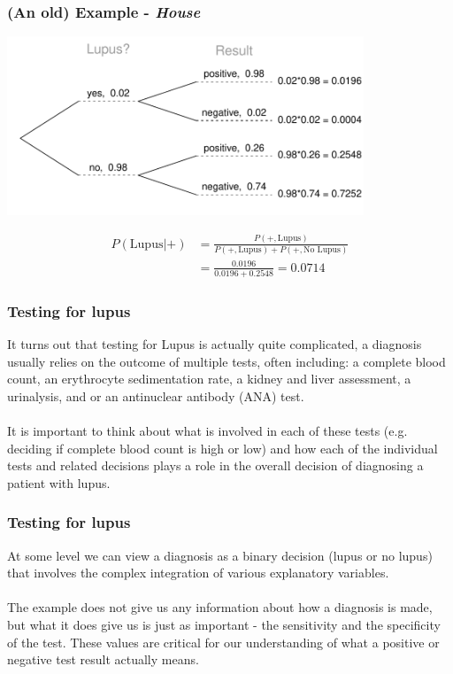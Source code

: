 
\begin{frame}
\frametitle{(An old) Example - \emph{House}}

\begin{center}
\includegraphics[width=0.8\textwidth]{9-5_logistic_reg/figures/tree_lupus.pdf}
\end{center}

{\footnotesize
\begin{align*}
P(\text{Lupus} | +)  &= \frac{P(+,\text{Lupus})}{P(+,\text{Lupus})+P(+,\text{No Lupus})} \\
                     &= \frac{0.0196}{0.0196+0.2548} = 0.0714
\end{align*}
}
\end{frame}


\begin{frame}
\frametitle{Testing for lupus}
It turns out that testing for Lupus is actually quite complicated, a diagnosis usually relies on the outcome of multiple tests, often including: a complete blood count, an erythrocyte sedimentation rate, a kidney and liver assessment, a urinalysis, and or an antinuclear antibody (ANA) test.\\
~\\
It is important to think about what is involved in each of these tests (e.g. deciding if complete blood count is high or low) and how each of the individual tests and related decisions plays a role in the overall decision of diagnosing a patient with lupus.\\

\end{frame}


\begin{frame}
\frametitle{Testing for lupus}

At some level we can view a diagnosis as a binary decision (lupus or no lupus) that involves the complex integration of various explanatory variables.\\
~\\
The example does not give us any information about how a diagnosis is made, but what it does give us is just as important - the sensitivity and the specificity of the test. These values are critical for our understanding of what a positive or negative test result actually means.

\end{frame}

